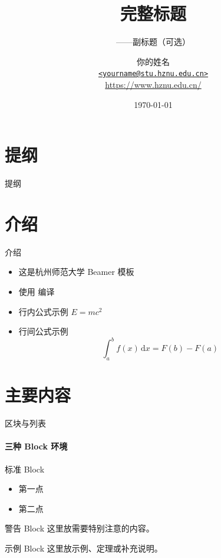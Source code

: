\documentclass[10pt,aspectratio=169]{beamer}
\title[短标题]{完整标题}
\subtitle{——副标题（可选）}
\author[作者缩写]{%
  \texorpdfstring{%
    你的姓名 \\\medskip
    {\small
      \href{mailto:yourname@stu.hznu.edu.cn}
        {\nolinkurl{<yourname@stu.hznu.edu.cn>}}%
    } \\
    {\small \url{https://www.hznu.edu.cn/}}%
  }{你的姓名}%
}
\institute[学院缩写]{%
  学院名称 \\
  杭州师范大学%
}
\date[\today]{\today}
\begin{document}
\begin{frame}[plain]
  \titlepage
\end{frame}

\section{提纲}
\begin{frame}{提纲}
  \tableofcontents
\end{frame}

\section{介绍}
\begin{frame}{介绍}
  \begin{itemize}
    \item 这是杭州师范大学 Beamer 模板
    \item 使用 \XeLaTeX 编译
    \item 行内公式示例 $E = mc^2$
    \item 行间公式示例
      \begin{equation}
        \int_a^b f(x)\,\mathrm{d}x = F(b) - F(a)
      \end{equation}
  \end{itemize}
\end{frame}

\section{主要内容}
\begin{frame}{区块与列表}
  \framesubtitle{三种 Block 环境}

  \begin{block}{标准 Block}
    \begin{itemize}
      \item 第一点
      \item 第二点
    \end{itemize}
  \end{block}

  \begin{alertblock}{警告 Block}
    这里放需要特别注意的内容。
  \end{alertblock}

  \begin{exampleblock}{示例 Block}
    这里放示例、定理或补充说明。
  \end{exampleblock}
\end{frame}
\end{document}
